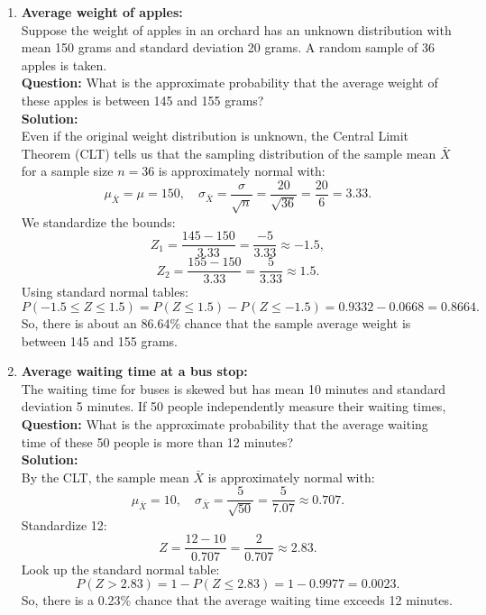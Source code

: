 \documentclass{book}
\begin{document}
\begin{enumerate}[label=Exercise \arabic*:]
    \item \textbf{Average weight of apples:} \\
    Suppose the weight of apples in an orchard has an unknown distribution with mean 150 grams and standard deviation 20 grams. A random sample of 36 apples is taken. \\
    \textbf{Question:} What is the approximate probability that the average weight of these apples is between 145 and 155 grams? \\
    \textbf{Solution:} \\
    Even if the original weight distribution is unknown, the Central Limit Theorem (CLT) tells us that the sampling distribution of the sample mean \(\bar{X}\) for a sample size \(n=36\) is approximately normal with:
    \[
    \mu_{\bar{X}} = \mu = 150, \quad \sigma_{\bar{X}} = \frac{\sigma}{\sqrt{n}} = \frac{20}{\sqrt{36}} = \frac{20}{6} = 3.33.
    \]
    We standardize the bounds:
    \[
    Z_1 = \frac{145 - 150}{3.33} = \frac{-5}{3.33} \approx -1.5,
    \]
    \[
    Z_2 = \frac{155 - 150}{3.33} = \frac{5}{3.33} \approx 1.5.
    \]
    Using standard normal tables:
    \[
    P(-1.5 \leq Z \leq 1.5) = P(Z \leq 1.5) - P(Z \leq -1.5) = 0.9332 - 0.0668 = 0.8664.
    \]
    So, there is about an 86.64\% chance that the sample average weight is between 145 and 155 grams.

    \item \textbf{Average waiting time at a bus stop:} \\
    The waiting time for buses is skewed but has mean 10 minutes and standard deviation 5 minutes. If 50 people independently measure their waiting times, \\
    \textbf{Question:} What is the approximate probability that the average waiting time of these 50 people is more than 12 minutes? \\
    \textbf{Solution:} \\
    By the CLT, the sample mean \(\bar{X}\) is approximately normal with:
    \[
    \mu_{\bar{X}} = 10, \quad \sigma_{\bar{X}} = \frac{5}{\sqrt{50}} = \frac{5}{7.07} \approx 0.707.
    \]
    Standardize 12:
    \[
    Z = \frac{12 - 10}{0.707} = \frac{2}{0.707} \approx 2.83.
    \]
    Look up the standard normal table:
    \[
    P(Z > 2.83) = 1 - P(Z \leq 2.83) = 1 - 0.9977 = 0.0023.
    \]
    So, there is a 0.23\% chance that the average waiting time exceeds 12 minutes.


\end{enumerate}
\end{document}
